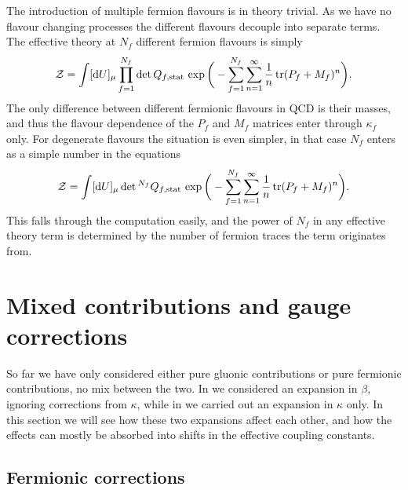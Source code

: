 The introduction of multiple fermion flavours is in theory trivial. As we have
no flavour changing processes the different flavours decouple into separate
terms. The effective theory at $N_f$ different fermion flavours is simply
%
\begin{equation}
  \mathcal{Z} = \int [\mathrm{d} U]_{\mu} \prod_{f=1}^{N_f} \det
  Q_{f,\mathrm{stat}} \, \exp \bigg( -\sum_{f=1}^{N_f} \sum_{n=1}^{\infty}
  \frac{1}{n} \operatorname{tr} (P_f + M_f)^n \bigg).
\end{equation}
%
The only difference between different fermionic flavours in QCD is their masses,
and thus the flavour dependence of the $P_f$ and $M_f$ matrices enter through
$\kappa_f$ only. For degenerate flavours the situation is even simpler, in that
case $N_f$ enters as a simple number in the equations
%
\begin{equation}
  \mathcal{Z} = \int [\mathrm{d} U]_{\mu}  \det{}^{N_f} Q_{f,\mathrm{stat}} \,
  \exp \bigg( -\sum_{f=1}^{N_f} \sum_{n=1}^{\infty}
  \frac{1}{n} \operatorname{tr} (P_f + M_f)^n \bigg).
\end{equation}
%
This falls through the computation easily, and the power of $N_f$ in any
effective theory term is determined by the number of fermion traces the term
originates from.

\section{Mixed contributions and gauge corrections}

So far we have only considered either pure gluonic contributions or pure
fermionic contributions, no mix between the two. In 
we considered an expansion in $\beta$, ignoring corrections from $\kappa$, while
in  we carried out an expansion in $\kappa$
only. In this section we will see how these two expansions affect each other,
and how the effects can mostly be absorbed into shifts in the effective coupling
constants.

\subsection{Fermionic corrections}

